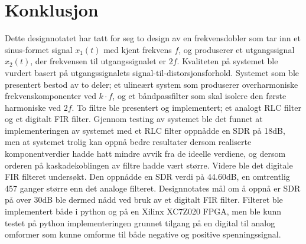 \newpage
\section{Konklusjon}
\label{konklusjon}

Dette designnotatet har tatt for seg to design av en frekvensdobler som 
tar inn et sinus-formet signal $x_1(t)$ med kjent frekvens $f$, og produserer et utgangssignal 
$\hat{x}_2(t)$, der frekvensen til utgangssignalet er $2f$. Kvaliteten på systemet
ble vurdert basert på utgangssignalets signal-til-distorsjonsforhold. Systemet som ble 
presentert bestod av to deler; et ulineært system som produserer overharmoniske frekvenskomponenter ved 
$k \cdot f$, og et båndpassfilter som skal isolere den første harmoniske ved $2f$. To 
filtre ble presentert og implementert; et analogt RLC filter og et digitalt FIR filter.
Gjennom testing av systemet ble det funnet at implementeringen av systemet med et RLC filter 
oppnådde en SDR på 18dB, men at systemet trolig kan oppnå bedre resultater dersom realiserte 
komponentverdier hadde hatt mindre avvik fra de ideelle verdiene, og dersom orderen på kaskadekoblingen 
av filtre hadde vært større. Videre ble det digitale FIR filteret undersøkt. Den oppnådde en SDR 
verdi på 44.60dB, en omtrentlig 457 ganger større enn det analoge filteret. Designnotates mål om å oppnå
er SDR på over 30dB ble dermed nådd ved bruk av et digitalt FIR filter. Filteret ble implementert både 
i python og på en Xilinx XC7Z020 FPGA, men ble kunn testet på python implementeringen grunnet tilgang på 
en digital til analog omformer som kunne omforme til både negative og positive spenningssignal.
